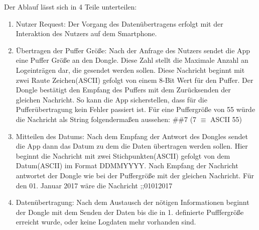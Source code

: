 Der Ablauf lässt sich in 4 Teile unterteilen:
\begin{enumerate}
  \item Nutzer Request: Der Vorgang des Datenübertragens erfolgt mit der Interaktion des Nutzers auf dem Smartphone. 
  \item Übertragen der Puffer Größe: Nach der Anfrage des Nutzers sendet die App eine Puffer Größe an den Dongle. Diese Zahl stellt die Maximale Anzahl an Logeinträgen dar, die gesendet werden sollen. Diese Nachricht beginnt mit zwei Raute Zeichen(ASCII) gefolgt von einem 8-Bit Wert für den Puffer. Der Dongle bestätigt den Empfang des Puffers mit dem Zurücksenden der gleichen Nachricht. So kann die App sicherstellen, dass für die Pufferübertragung kein Fehler passiert ist. Für eine Puffergröße von 55 würde die Nachricht als String folgendermaßen aussehen: \#\#7 (7 $\equiv$ ASCII 55)
  \item  Mitteilen des Datums: Nach dem Empfang der Antwort des Dongles sendet die App dann das Datum zu dem die Daten übertragen werden sollen. Hier beginnt die Nachricht mit zwei Stichpunkten(ASCII) gefolgt von dem Datum(ASCII) im Format DDMMYYYY. Nach Empfang der Nachricht antwortet der Dongle wie bei der Puffergröße mit der gleichen Nachricht. Für den 01. Januar 2017 wäre die Nachricht ;;01012017
  \item Datenübertragung: Nach dem Austausch der nötigen Informationen beginnt der Dongle mit dem Senden der Daten bis die in 1. definierte Pufffergröße erreicht wurde, oder keine Logdaten mehr vorhanden sind.
\end{enumerate}
